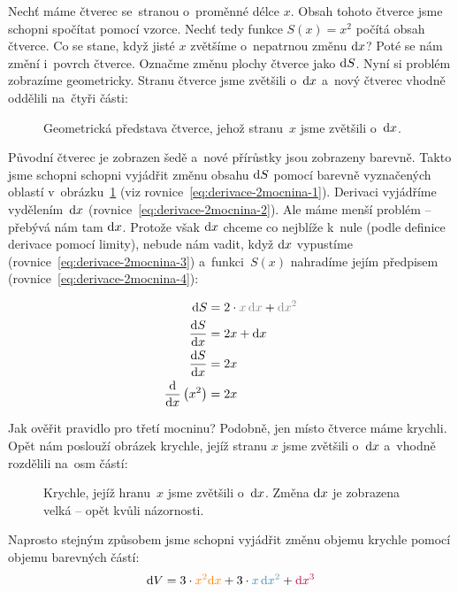 Nechť máme čtverec se~stranou o~proměnné délce $x$. Obsah tohoto čtverce jsme schopni
spočítat pomocí vzorce. Nechť tedy funkce $S(x) = x^2$ počítá obsah čtverce. Co se
stane, když jisté $x$ zvětšíme o~nepatrnou změnu $\mathrm{d} x$? Poté se nám změní
i~povrch čtverce. Označme změnu plochy čtverce jako $\mathrm{d} S$. Nyní si problém
zobrazíme geometricky. Stranu čtverce jsme zvětšili o~$\mathrm{d} x$ a~nový čtverec
vhodně oddělili na~čtyři části:

\begin{figure}[h!]
    \centering
    
    \caption{Geometrická představa čtverce, jehož stranu~$x$ jsme zvětšili o~$\mathrm{d} x$.}
    \label{fig:derivace-rozdel-ctverec}
\end{figure}

Původní čtverec je zobrazen šedě a~nové přírůstky jsou zobrazeny barevně. Takto jsme
schopni schopni vyjádřit změnu obsahu $\mathrm{d} S$ pomocí barevně vyznačených
oblastí v~obrázku~\ref{fig:derivace-rozdel-ctverec} (viz rovnice~\ref{eq:derivace-2mocnina-1}).
Derivaci vyjádříme vydělením~$\mathrm{d} x$ (rovnice~\ref{eq:derivace-2mocnina-2}).
Ale máme menší problém -- přebývá nám tam $\mathrm{d} x$. Protože však $\mathrm{d} x$
chceme co nejblíže k~nule (podle definice derivace pomocí limity), nebude nám vadit,
když $\mathrm{d} x$ vypustíme (rovnice~\ref{eq:derivace-2mocnina-3}) a~funkci~$S(x)$
nahradíme jejím předpisem (rovnice~\ref{eq:derivace-2mocnina-4}):

\begin{subequations}
\begin{align}
    \diff{S} &= 2 \cdot {\color{accentColor} x \, \diff{x}} + {\color{accentColor!50!gray} \diff{x}^2}
    \label{eq:derivace-2mocnina-1} \\
    \fracdiff{S}{x} &= 2x + \diff{x}
    \label{eq:derivace-2mocnina-2} \\
    \fracdiff{S}{x} &= 2x
    \label{eq:derivace-2mocnina-3} \\
    \fracdiff{}{x} \left( x^2 \right) &= 2x
    \label{eq:derivace-2mocnina-4}
\end{align}
\end{subequations}

Jak ověřit pravidlo pro třetí mocninu? Podobně, jen místo čtverce máme krychli. Opět
nám poslouží obrázek krychle, jejíž stranu $x$ jsme zvětšili o~$\mathrm{d} x$ a~vhodně
rozdělili na~osm částí:

\begin{figure}[!ht]
    \centering
    
    
    \caption{Krychle, jejíž hranu~$x$ jsme zvětšili o~$\mathrm{d} x$. Změna $\mathrm{d} x$
    je zobrazena velká -- opět kvůli názornosti.}
    \label{fig:derivace-rozdel-krychle}
\end{figure}

Naprosto stejným způsobem jsme schopni vyjádřit změnu objemu krychle pomocí objemu
barevných částí:
\begin{equation*}
    \mathrm{d}V = 3 \cdot {\color{orange} x^2 \diff{x}}
        + 3 \cdot {\color{cyan!70!black} x \, \diff{x}^2}
        + {\color{purple} \diff{x}^3}
\end{equation*}
